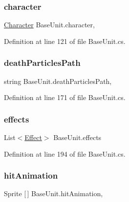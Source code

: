 \subsubsection{\texorpdfstring{character}{character}}
{\footnotesize\ttfamily \mbox{\hyperlink{class_character}{Character}} Base\+Unit.\+character\hspace{0.3cm}{\ttfamily [get]}, {\ttfamily [set]}}



Definition at line 121 of file Base\+Unit.\+cs.

\mbox{\label{class_base_unit_a23efd5d5395504252a9abd3a4d1b9b31}} 
\subsubsection{\texorpdfstring{deathParticlesPath}{deathParticlesPath}}
{\footnotesize\ttfamily string Base\+Unit.\+death\+Particles\+Path\hspace{0.3cm}{\ttfamily [get]}, {\ttfamily [set]}}



Definition at line 171 of file Base\+Unit.\+cs.

\mbox{\label{class_base_unit_a2f2fc76642a941efd3aeaaf9870f38ac}} 
\subsubsection{\texorpdfstring{effects}{effects}}
{\footnotesize\ttfamily List$<$\mbox{\hyperlink{class_effect}{Effect}}$>$ Base\+Unit.\+effects\hspace{0.3cm}{\ttfamily [get]}}



Definition at line 194 of file Base\+Unit.\+cs.

\mbox{\label{class_base_unit_a284caf011a396d4744a5acac8cbca7ea}} 
\subsubsection{\texorpdfstring{hitAnimation}{hitAnimation}}
{\footnotesize\ttfamily Sprite \mbox{[}$\,$\mbox{]} Base\+Unit.\+hit\+Animation\hspace{0.3cm}{\ttfamily [get]}, {\ttfamily [set]}}



